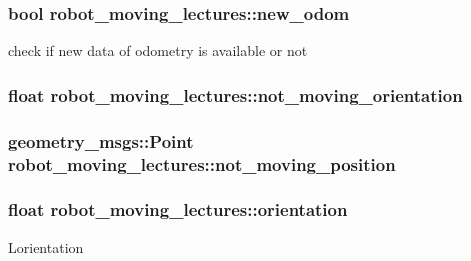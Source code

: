 \subsubsection[{\texorpdfstring{new\+\_\+odom}{new_odom}}]{\setlength{\rightskip}{0pt plus 5cm}bool robot\+\_\+moving\+\_\+lectures\+::new\+\_\+odom\hspace{0.3cm}{\ttfamily [private]}}\hypertarget{classrobot__moving__lectures_a1bdd03baed3531faaee9dd857bd5d6ce}{}\label{classrobot__moving__lectures_a1bdd03baed3531faaee9dd857bd5d6ce}
check if new data of odometry is available or not 
\subsubsection[{\texorpdfstring{not\+\_\+moving\+\_\+orientation}{not_moving_orientation}}]{\setlength{\rightskip}{0pt plus 5cm}float robot\+\_\+moving\+\_\+lectures\+::not\+\_\+moving\+\_\+orientation\hspace{0.3cm}{\ttfamily [private]}}\hypertarget{classrobot__moving__lectures_a72e1bcf012f8491fbb695516c8d74d5a}{}\label{classrobot__moving__lectures_a72e1bcf012f8491fbb695516c8d74d5a}
\subsubsection[{\texorpdfstring{not\+\_\+moving\+\_\+position}{not_moving_position}}]{\setlength{\rightskip}{0pt plus 5cm}geometry\+\_\+msgs\+::\+Point robot\+\_\+moving\+\_\+lectures\+::not\+\_\+moving\+\_\+position\hspace{0.3cm}{\ttfamily [private]}}\hypertarget{classrobot__moving__lectures_a64795c4c36e3297d78c3a4a89010a07f}{}\label{classrobot__moving__lectures_a64795c4c36e3297d78c3a4a89010a07f}
\subsubsection[{\texorpdfstring{orientation}{orientation}}]{\setlength{\rightskip}{0pt plus 5cm}float robot\+\_\+moving\+\_\+lectures\+::orientation\hspace{0.3cm}{\ttfamily [private]}}\hypertarget{classrobot__moving__lectures_a8dec7729789a291520b1da07550cfc1b}{}\label{classrobot__moving__lectures_a8dec7729789a291520b1da07550cfc1b}
L\textquotesingle{}orientation 
